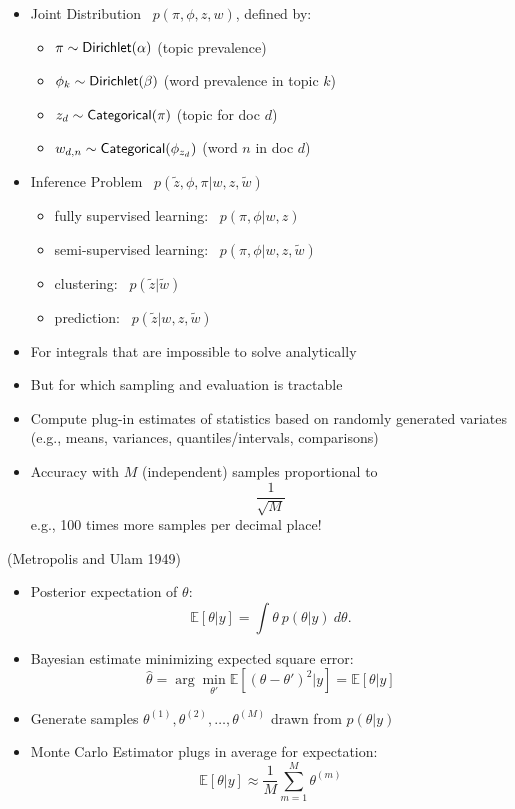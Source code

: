 \documentclass[10pt]{report}
\newcommand{\sld}[1]{\newpage{\noindent\LARGE \ \ \
    \textcolor{MidnightBlue}{\bfseries #1}}\vspace*{4pt}}
\begin{document}
\sld{``Naive Bayes'' Four Ways}
\begin{itemize}
%
\item Joint Distribution \ $p(\pi,\phi,z,w)$, defined by:
\vspace*{-3pt}
\begin{itemize}\small
\item $\pi \sim \mbox{\sf Dirichlet}(\alpha)$    \hfill (topic prevalence)
\item $\phi_k \sim \mbox{\sf Dirichlet}(\beta)$  \hfill (word
  prevalence in topic $k$)
\item $z_d \sim \mbox{\sf Categorical}(\pi)$     \hfill (topic for doc $d$)
\item $w_{d,n} \sim \mbox{\sf Categorical}(\phi_{z_d})$  \hfill (word
  $n$ in doc $d$)
\end{itemize}
%
\item Inference Problem \ $p(\tilde{z},\phi,\pi |  w, z, \tilde{w})$
\vspace*{-3pt}
\begin{itemize}\small
\item fully supervised learning: \ $p(\pi,\phi | w, z)$
\item semi-supervised learning: \ $p(\pi, \phi | w, z,
  \tilde{w})$
\item clustering: \ $p(\tilde{z} | \tilde{w})$
\item prediction: \ $p(\tilde{z} | w, z, \tilde{w})$
\end{itemize}
\end{itemize}



\sld{Monte Carlo Methods}
\begin{itemize}
\item For integrals that are impossible to solve analytically
\item But for which sampling and evaluation is tractable
\item Compute plug-in estimates of statistics based on
  randomly generated variates (e.g., means, variances,
  quantiles/intervals, comparisons)
\item Accuracy with $M$ (independent) samples proportional to
  \[
  \frac{1}{\sqrt{M}}
  \]
  e.g., 100 times more samples per decimal place!
\end{itemize}
\vfill\hfill
{\small (Metropolis and Ulam 1949)}


\sld{Monte Carlo Example}
\begin{itemize}
\item Posterior expectation of $\theta$:
  \[
  \mathbb{E}[\theta|y] = \int \theta \ p(\theta|y) \ d\theta.
  \]
\item Bayesian estimate minimizing expected square error: 
  \[
  \hat{\theta} 
  = \arg\min_{\theta'}
  \mathbb{E}[(\theta - \theta')^2|y]
  = \mathbb{E}[\theta|y] 
  \]
\item Generate samples $\theta^{(1)}, \theta^{(2)}, \ldots,
  \theta^{(M)}$ drawn from $p(\theta|y)$
\item Monte Carlo Estimator plugs in average for expectation:
  \[
  \mathbb{E}[\theta|y] \approx \frac{1}{M} \sum_{m=1}^M \theta^{(m)}
  \]
\end{itemize}
\end{document}
